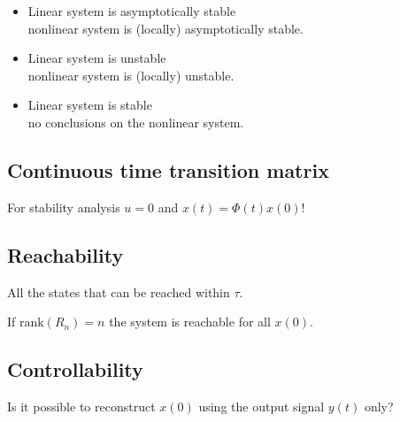 \documentclass[10pt,a4paper]{scrartcl}
\begin{document}
\begin{multicols*}{3}
\begin{itemize}
\item Linear system is asymptotically stable \\ \dahe nonlinear system is (locally) asymptotically stable.
\item Linear system is unstable \\ \dahe nonlinear system is (locally) unstable.
\item Linear system is stable \\ \dahe no conclusions on the nonlinear system.
\end{itemize}

\subsection{Continuous time transition matrix}



For stability analysis $u=0$ and $x(t)=\Phi(t)x(0)$!

\subsection{Reachability}


All the states that can be reached within $\tau$.


If $\text{rank}(R_n)=n$ the system is reachable for all $x(0)$.

\subsection{Controllability}

Is it possible to reconstruct $x(0)$ using the output signal $y(t)$ only?



\end{multicols*}
\end{document}
